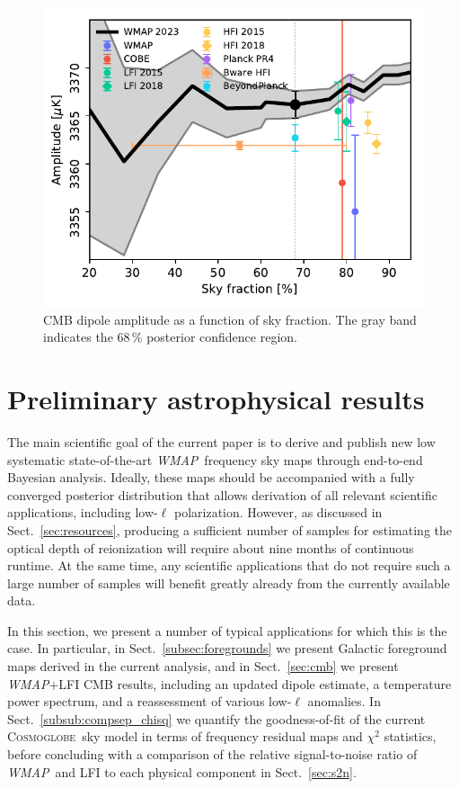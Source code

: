 \documentclass[twocolumn]{../../common/aa}
\def\WMAP{\emph{WMAP}}
\newcommand{\cosmoglobe}{\textsc{Cosmoglobe}}
\begin{document}
\begin{figure}
	\includegraphics[width=\columnwidth]{figures/dip_amplitude.pdf}
	\caption{CMB dipole amplitude as a function of sky fraction. The gray band indicates the 68\,\% posterior confidence region.}
	\label{fig:dip_amp}
\end{figure}





\section{Preliminary astrophysical results}
\label{sec:astrophysics}

The main scientific goal of the current paper is to derive and publish new low systematic state-of-the-art \WMAP\ frequency sky maps through end-to-end Bayesian analysis. Ideally, these maps should be accompanied with a fully converged posterior distribution that allows derivation of all relevant scientific applications, including low-$\ell$ polarization. However, as discussed in Sect.~\ref{sec:resources}, producing a sufficient number of samples for estimating the optical depth of reionization will require about nine months of continuous runtime. At the same time, any scientific applications that do not require such a large number of samples will benefit greatly already from the currently available data.

In this section, we present a number of typical applications for which this is the case. In particular, in Sect.~\ref{subsec:foregrounds} we present Galactic foreground maps derived in the current analysis, and in Sect.~\ref{sec:cmb} we present \WMAP+LFI CMB results, including an updated dipole estimate, a temperature power spectrum, and a reassessment of various low-$\ell$ anomalies. In Sect.~\ref{subsub:compsep_chisq} we quantify the goodness-of-fit of the current \cosmoglobe\ sky model in terms of frequency residual maps and $\chi^2$ statistics, before concluding with a comparison of the relative signal-to-noise ratio of \WMAP\ and LFI to each physical component in Sect.~\ref{sec:s2n}. 
\end{document}
